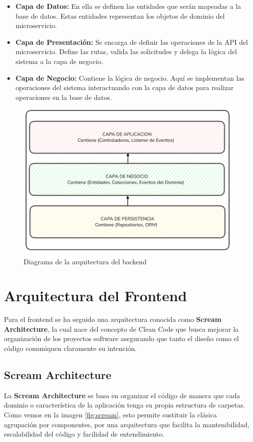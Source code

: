 \begin{itemize}
    \item \textbf{Capa de Datos:} En ella se definen las entidades que serán mapeadas a la base de datos. Estas entidades representan los objetos de dominio del microservicio.
    \item \textbf{Capa de Presentación:} Se encarga de definir las operaciones de la API del microservicio. Define las rutas, valida las solicitudes y delega la lógica del sistema a la capa de negocio.
    \item \textbf{Capa de Negocio:} Contiene la lógica de negocio. Aquí se implementan las operaciones del sistema interactuando con la capa de datos para realizar operaciones en la base de datos.
\end{itemize}
\begin{figure}[h!]
    \centering
    \includegraphics[width=\textwidth]{fotos/capas-backend.png}
    \caption{Diagrama de la arquitectura del backend}
    \label{fig:capas}
\end{figure}

\section{Arquitectura del Frontend}
Para el frontend se ha seguido una arquitectura conocida como \textbf{Scream Architecture}, la cual nace del concepto de Clean Code \cite{martin_clean_architecture} que busca mejorar la organización de los proyectos software asegurando que tanto el diseño como el código comuniquen claramente su intención.

\subsection{Scream Architecture}
La \textbf{Scream Architecture} se basa en organizar el código de manera que cada dominio o característica de la aplicación tenga su propia estructura de carpetas. Como vemos en la imagen \ref{fig:scream}, esto permite sustituir la clásica agrupación por componentes, por una arquitectura que facilita la mantenibilidad, escalabilidad del código y facilidad de entendimiento.


